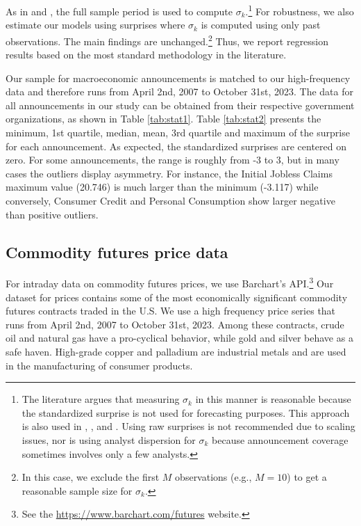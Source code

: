 As in \citet{balduzzi2001economic} and \citet{kurov2019price}, the full sample period is used to compute $\sigma_k$.\footnote{The literature argues that measuring $\sigma_k$ in this manner is reasonable because the standardized surprise is not used for forecasting purposes. This approach is also used in \citet{SCOTTI20161}, \citet{andersen2003micro}, and \citet{NBERw19523}. Using raw surprises is not recommended due to scaling issues, nor is using analyst dispersion for $\sigma_k$ because announcement coverage sometimes involves only a few analysts.} For robustness, we also estimate our models using surprises where $\sigma_{k}$ is computed using only past observations. The main findings are unchanged.\footnote{In this case, we exclude the first $M$ observations (e.g., $M=10$)  to get a reasonable sample size for $\sigma_{k}$.}  Thus, we report regression results based on the most standard methodology in the literature.


Our sample for macroeconomic announcements is matched to our high-frequency data and therefore runs from April 2nd, 2007 to October 31st, 2023. The data for all announcements in our study can be obtained from their respective government organizations, as shown in Table \ref{tab:stat1}. 
Table \ref{tab:stat2} presents the minimum, 1st quartile, median, mean, 3rd quartile and maximum of the surprise for each announcement. As expected, the standardized surprises are centered on zero. For some announcements, the range is roughly from -3 to 3, but in many cases the outliers display asymmetry. For instance, the Initial Jobless Claims maximum value (20.746) is much larger than the minimum (-3.117) while conversely, Consumer Credit and Personal Consumption show larger negative than positive outliers. 



\subsection{Commodity futures price data}

For intraday data on commodity futures prices, we use Barchart's API.\footnote{ See the \url{https://www.barchart.com/futures} website.}  Our dataset for prices contains some of the most economically significant commodity futures contracts traded in the U.S. We use a high frequency price series that runs from April 2nd, 2007 to October 31st, 2023. Among these contracts, crude oil and natural gas have a pro-cyclical behavior, while gold and silver behave as a safe haven. High-grade copper and palladium are industrial metals and are used in the manufacturing of consumer products. %

